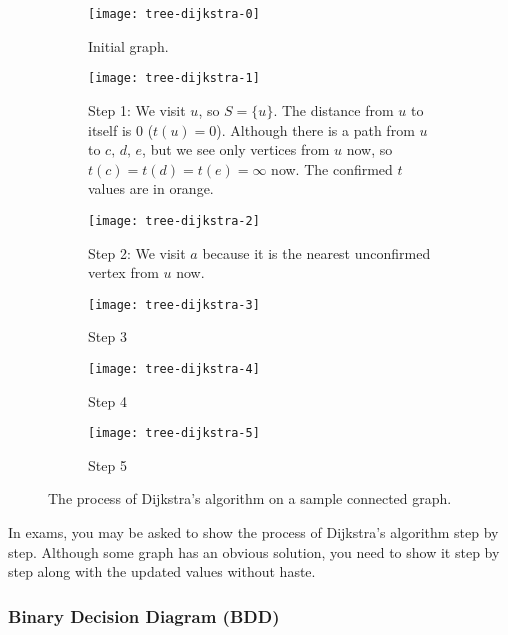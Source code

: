 \documentclass[../src/handouts/main.tex]{subfiles}
\begin{document}
\begin{figure}
  \centering
  \begin{subfigure}[t]{.45\textwidth}
    \centering
    \texttt{[image: tree-dijkstra-0]}
    \caption{Initial graph.}
    \label{fig:tree-dijkstra-0}
  \end{subfigure}
  \hfill
  \begin{subfigure}[t]{.45\textwidth}
    \centering
    \texttt{[image: tree-dijkstra-1]}
    \caption{Step 1: We visit $u$, so $S = \{ u \}$. The distance from $u$ to itself is 0 ($t(u) = 0$). Although there is a path from $u$ to $c,\, d,\, e$, but we see only vertices from $u$ now, so $t(c) = t(d) = t(e) = \infty$ now. The confirmed $t$ values are in orange.}
    \label{fig:tree-dijkstra-1}
  \end{subfigure}

  \begin{subfigure}[t]{.45\textwidth}
    \centering
    \texttt{[image: tree-dijkstra-2]}
    \caption{Step 2: We visit $a$ because it is the nearest unconfirmed vertex from $u$ now.}
    \label{fig:tree-dijkstra-2}
  \end{subfigure}
  \hfill
  \begin{subfigure}[t]{.45\textwidth}
    \centering
    \texttt{[image: tree-dijkstra-3]}
    \caption{Step 3}
    \label{fig:tree-dijkstra-3}
  \end{subfigure}

  \begin{subfigure}[t]{.45\textwidth}
    \centering
    \texttt{[image: tree-dijkstra-4]}
    \caption{Step 4}
    \label{fig:tree-dijkstra-4}
  \end{subfigure}
  \hfill
  \begin{subfigure}[t]{.45\textwidth}
    \centering
    \texttt{[image: tree-dijkstra-5]}
    \caption{Step 5}
    \label{fig:tree-dijkstra-5}
  \end{subfigure}

  \caption{The process of Dijkstra's algorithm on a sample connected graph.}
  \label{fig:tree-dijkstra}
\end{figure}

In exams, you may be asked to show the process of Dijkstra's algorithm step by step. Although some graph has an obvious solution, you need to show it step by step along with the updated values without haste.

\subsubsection{Binary Decision Diagram (BDD)}
\end{document}
